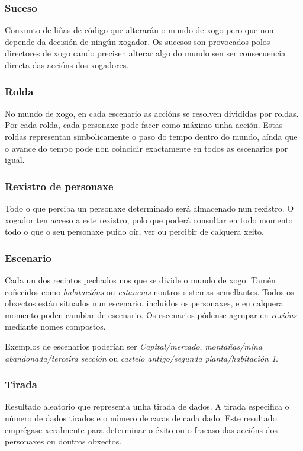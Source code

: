 \subsubsection{Suceso}
Conxunto de liñas de código que alterarán o mundo de xogo pero que non depende
da decisión de ningún xogador. Os sucesos son provocados polos directores de
xogo cando precisen alterar algo do mundo sen ser consecuencia directa das
accións dos xogadores.

\subsubsection{Rolda}
No mundo de xogo, en cada escenario as accións se resolven divididas por roldas.
Por cada rolda, cada personaxe pode facer como máximo unha acción. Estas roldas
representan simbolicamente o paso do tempo dentro do mundo, aínda que o avance
do tempo pode non coincidir exactamente en todos as escenarios por igual.

\subsubsection{Rexistro de personaxe}
Todo o que perciba un personaxe determinado será almacenado nun rexistro. O
xogador ten acceso a este rexistro, polo que poderá consultar en todo momento
todo o que o seu personaxe puido oír, ver ou percibir de calquera xeito.

\subsubsection{Escenario}
Cada un dos recintos pechados nos que se divide o mundo de xogo. Tamén coñecidos
como {\it habitacións} ou {\it estancias} noutros sistemas semellantes. Todos os
obxectos están situados nun escenario, incluídos os personaxes, e en calquera
momento poden cambiar de escenario. Os escenarios pódense agrupar en {\it
rexións} mediante nomes compostos.
\par
Exemplos de escenarios poderían ser {\it Capital/mercado}, {\it montañas/mina
abandonada/terceira sección} ou {\it castelo antigo/segunda planta/habitación
1}.

\subsubsection{Tirada}
Resultado aleatorio que representa unha tirada de dados. A tirada especifica o
número de dados tirados e o número de caras de cada dado. Este resultado
emprégase xeralmente para determinar o éxito ou o fracaso das accións dos
personaxes ou doutros obxectos.

